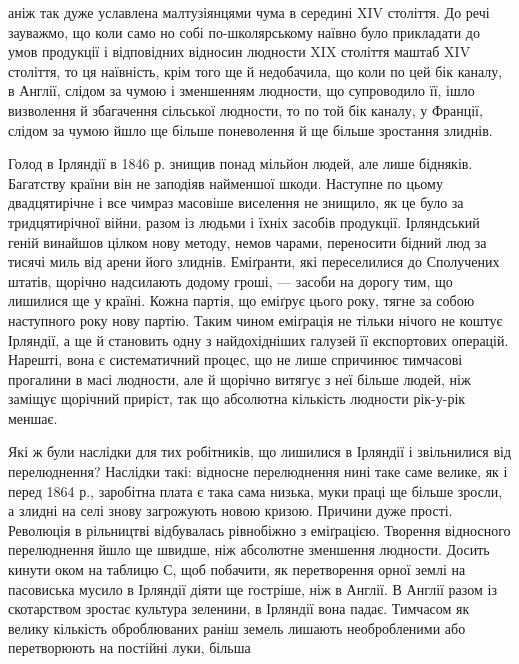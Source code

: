 \parcont{}  %
аніж так дуже уславлена малтузіянцями чума в середині
XIV століття. До речі зауважмо, що коли само но собі по-школярському
наївно було прикладати до умов продукції і відповідних
відносин людности XIX століття маштаб XIV століття,
то ця наївність, крім того ще й недобачила, що коли
по цей бік каналу, в Англії, слідом за чумою і зменшенням
людности, що супроводило її, ішло визволення й збагачення
сільської людности, то по той бік каналу, у Франції, слідом за
чумою йшло ще більше поневолення й ще більше зростання
злиднів.

Голод в Ірляндії в 1846 р. знищив понад мільйон людей, але
лише бідняків. Багатству країни він не заподіяв найменшої
шкоди. Наступне по цьому двадцятирічне і все чимраз масовіше
виселення не знищило, як це було за тридцятирічної війни,
разом із людьми і їхніх засобів продукції. Ірляндський геній
винайшов цілком нову методу, немов чарами, переносити бідний
люд за тисячі миль від арени його злиднів. Еміґранти, які переселилися
до Сполучених штатів, щорічно надсилають додому гроші,
— засоби на дорогу тим, що лишилися ще у країні. Кожна
партія, що еміґрує цього року, тягне за собою наступного року
нову партію. Таким чином еміґрація не тільки нічого не коштує
Ірляндії, а ще й становить одну з найдохідніших галузей її експортових
операцій. Нарешті, вона є систематичний процес, що
не лише спричинює тимчасові прогалини в масі людности, але
й щорічно витягує з неї більше людей, ніж заміщує щорічний
приріст, так що абсолютна кількість людности рік-у-рік
меншає.

Які ж були наслідки для тих робітників, що лишилися в Ірляндії
і звільнилися від перелюднення? Наслідки такі: відносне
перелюднення нині таке саме велике, як і перед 1864 р., заробітна
плата є така сама низька, муки праці ще більше зросли, а злидні
на селі знову загрожують новою кризою. Причини дуже прості.
Революція в рільництві відбувалась рівнобіжно з еміґрацією.
Творення відносного перелюднення йшло ще швидше, ніж абсолютне
зменшення людности. Досить кинути оком на таблицю
С, щоб побачити, як перетворення орної землі на пасовиська
мусило в Ірляндії діяти ще гостріше, ніж в Англії. В Англії разом
із скотарством зростає культура зеленини, в Ірляндії вона падає.
Тимчасом як велику кількість оброблюваних раніш земель лишають
необробленими або перетворюють на постійні луки, більша
\parbreak{}  %
